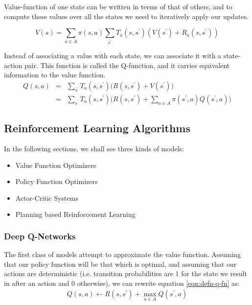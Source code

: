Value-function of one state can be written in terms of that of others, and to compute these values over all the states we need to iteratively apply our updates.

\begin{equation}
    V(s) = \sum_{a \in A} \pi(s, a) \sum_{s^\prime} T_a(s, s^\prime) (V(s^\prime) + R_a(s, s^\prime))
\end{equation}

Instead of associating a value with each state, we can associate it with a state-action pair. This function is called the Q-function, and it carries equivalent information to the value function.
\begin{eqnarray}\label{eqn:defn-q-v-fn}
    Q(s, a) &=& \sum_{s^\prime} T_a(s, s^\prime) \bigg(R(s, s^\prime) + V(s^\prime) \bigg)\\
            &=& \sum_{s^\prime} T_a(s, s^\prime) \bigg(R(s, s^\prime) + \sum_{a \in A} \pi(s^\prime, a) Q(s^\prime, a)\bigg)
\end{eqnarray}

\subsection{Reinforcement Learning Algorithms}

In the following sections, we shall see three kinds of models:
\begin{itemize}
    \item Value Function Optimizers
    \item Policy Function Optimizers
    \item Actor-Critic Systems
    \item Planning based Reinforcement Learning
\end{itemize}


\subsubsection{Deep Q-Networks}

The first class of models attempt to approximate the value function. Assuming that our policy function will be that which is optimal, and assuming that our actions are deterministic (i.e. transition probabilities are 1 for the state we result in after an action and 0 otherwise), we can rewrite equation \ref{eqn:defn-q-fn} as:
\begin{eqnarray}\label{eqn:defn-q-fn}
    Q(s, a) \leftarrow R(s, s^\prime) + \max_{a \in A} Q(s^\prime, a)
\end{eqnarray}

